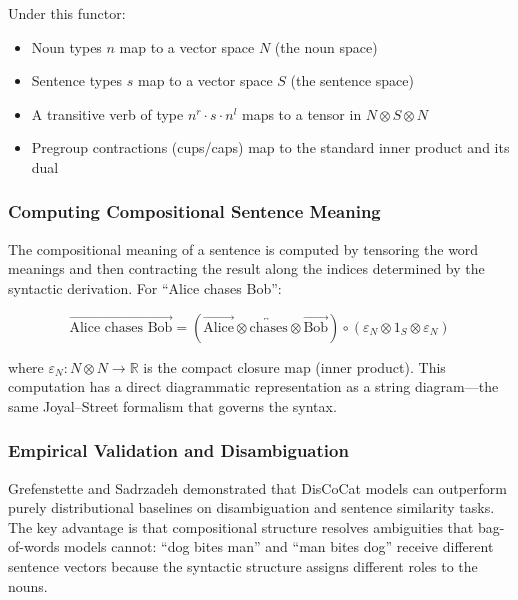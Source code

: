 \documentclass[
]{article}
\providecommand{\tightlist}{%
  \setlength{\itemsep}{0pt}\setlength{\parskip}{0pt}}
\numberwithin{equation}{section}
\begin{document}
Under this functor:

\begin{itemize}
\tightlist
\item
  Noun types \(n\) map to a vector space \(N\) (the noun space)
\item
  Sentence types \(s\) map to a vector space \(S\) (the sentence space)
\item
  A transitive verb of type \(n^r \cdot s \cdot n^l\) maps to a tensor
  in \(N \otimes S \otimes N\)
\item
  Pregroup contractions (cups/caps) map to the standard inner product
  and its dual
\end{itemize}

\subsubsection{Computing Compositional Sentence
Meaning}\label{computing-compositional-sentence-meaning}

The compositional meaning of a sentence is computed by tensoring the
word meanings and then contracting the result along the indices
determined by the syntactic derivation. For ``Alice chases Bob'':

\[\overrightarrow{\text{Alice chases Bob}} = (\overrightarrow{\text{Alice}} \otimes \overleftrightarrow{\text{chases}} \otimes \overrightarrow{\text{Bob}}) \circ (\varepsilon_N \otimes 1_S \otimes \varepsilon_N) \tag{4.2}\]

where \(\varepsilon_N: N \otimes N \to \mathbb{R}\) is the compact
closure map (inner product). This computation has a direct diagrammatic
representation as a string diagram---the same Joyal--Street
\citep{joyalstreet1991geometry} formalism that governs the syntax.

\subsubsection{Empirical Validation and
Disambiguation}\label{empirical-validation-and-disambiguation}

Grefenstette and Sadrzadeh \citeyearpar{grefenstette2015concrete}
demonstrated that DisCoCat models can outperform purely distributional
baselines on disambiguation and sentence similarity tasks. The key
advantage is that compositional structure resolves ambiguities that
bag-of-words models cannot: ``dog bites man'' and ``man bites dog''
receive different sentence vectors because the syntactic structure
assigns different roles to the nouns.
\end{document}
